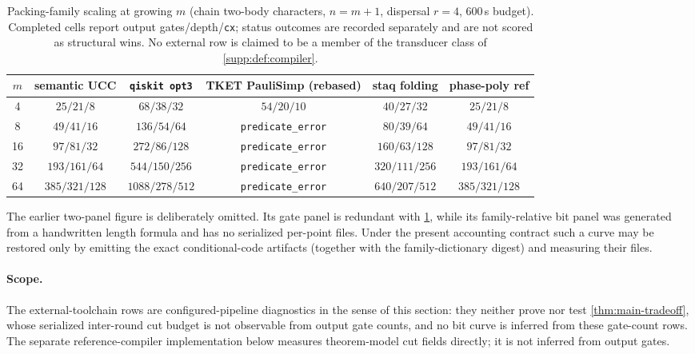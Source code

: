 \begin{table}[!t]
\centering
\small
\begin{tabular}{cccccc}
\toprule
$m$ & semantic UCC & \texttt{qiskit opt3} & TKET PauliSimp (rebased) & staq folding & phase-poly ref \\
\midrule
4  & $25/21/8$ & $68/38/32$ & $54/20/10$ & $40/27/32$ & $25/21/8$ \\
8  & $49/41/16$ & $136/54/64$ & \texttt{predicate\_error} & $80/39/64$ & $49/41/16$ \\
16 & $97/81/32$ & $272/86/128$ & \texttt{predicate\_error} & $160/63/128$ & $97/81/32$ \\
32 & $193/161/64$ & $544/150/256$ & \texttt{predicate\_error} & $320/111/256$ & $193/161/64$ \\
64 & $385/321/128$ & $1088/278/512$ & \texttt{predicate\_error} & $640/207/512$ & $385/321/128$ \\
\bottomrule
\end{tabular}
\caption{Packing-family scaling at growing $m$ (chain two-body
characters, $n = m+1$, dispersal $r = 4$, 600\,s budget). Completed cells
report output gates/depth/\texttt{cx}; status outcomes are recorded separately and are not
scored as structural wins. No external row is claimed to be a member of
the transducer class of \cref{supp:def:compiler}.}
\label{tab:packing-scaling}
\end{table}

The earlier two-panel figure is deliberately omitted.  Its gate panel is
redundant with \cref{tab:packing-scaling}, while its family-relative bit panel
was generated from a handwritten length formula and has no serialized
per-point files.  Under the present accounting contract such a curve may be
restored only by emitting the exact conditional-code artifacts (together with
the family-dictionary digest) and measuring their files.

\paragraph{Scope.}
The external-toolchain rows are configured-pipeline diagnostics in the
sense of this section: they neither prove nor test
\cref{thm:main-tradeoff}, whose serialized inter-round cut budget is not
observable from output gate counts, and no bit curve is inferred from these
gate-count rows.  The separate reference-compiler implementation below
measures theorem-model cut fields directly; it is not inferred from output
gates.

